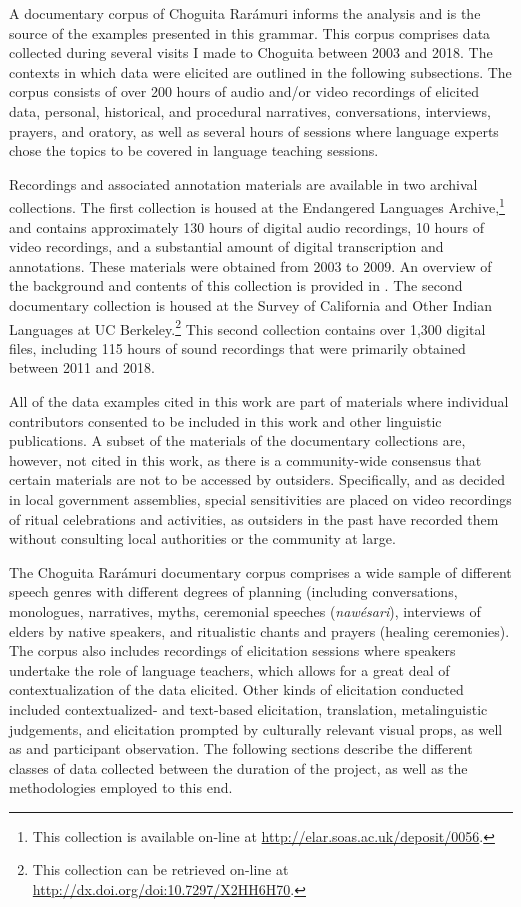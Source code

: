 A documentary corpus of Choguita Rarámuri informs the analysis and is the source of the examples presented in this grammar. This corpus comprises data collected during several visits I made to Choguita between 2003 and 2018. The contexts in which data were elicited are outlined in the following subsections. The corpus consists of over 200 hours of audio and/or video recordings of elicited data, personal, historical, and procedural narratives, conversations, interviews, prayers, and oratory, as well as several hours of sessions where language experts chose the topics to be covered in language teaching sessions.

Recordings and associated annotation materials are available in two archival collections. The first collection \citep{caballero2009corpus} is housed at the Endangered Languages Archive,\footnote{This collection is available on-line at \url{http://elar.soas.ac.uk/deposit/0056}.} and contains approximately 130 hours of digital audio recordings, 10 hours of video recordings, and a substantial amount of digital transcription and annotations. These materials were obtained from 2003 to 2009. An overview of the background and contents of this collection is provided in \citet{caballero2017choguita}. The second documentary collection \citep{chaparro2019corpus} is housed at the Survey of California and Other Indian Languages at UC Berkeley.\footnote{This collection can be retrieved on-line at \url{http://dx.doi.org/doi:10.7297/X2HH6H70}.} This second collection contains over 1,300 digital files, including 115 hours of sound recordings that were primarily obtained between 2011 and 2018.

All of the data examples cited in this work are part of materials where individual contributors consented to be included in this work and other linguistic publications. A subset of the materials of the documentary collections are, however, not cited in this work, as there is a community-wide consensus that certain materials are not to be accessed by outsiders. Specifically, and as decided in local government assemblies, special sensitivities are placed on video recordings of ritual celebrations and activities, as outsiders in the past have recorded them without consulting local authorities or the community at large.

The Choguita Rarámuri documentary corpus comprises a wide sample of different speech genres with different degrees of planning (including conversations, monologues, narratives, myths, ceremonial speeches (\textit{nawésari}), interviews of elders by native speakers, and ritualistic chants and prayers (healing ceremonies). The corpus also includes recordings of elicitation sessions where speakers undertake the role of language teachers, which allows for a great deal of contextualization of the data elicited. Other kinds of elicitation conducted included contextualized- and text-based elicitation, translation, metalinguistic judgements, and elicitation prompted by culturally relevant visual props, as well as and participant observation. The following sections describe the different classes of data collected between the duration of the project, as well as the methodologies employed to this end.

